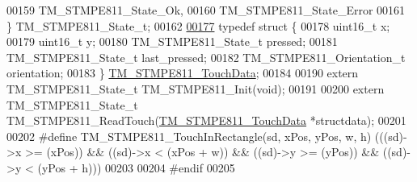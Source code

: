 \begin{DoxyCode}
00159     TM\_STMPE811\_State\_Ok,
00160     TM\_STMPE811\_State\_Error
00161 \} TM\_STMPE811\_State\_t;
00162 
\hypertarget{tm__stm32f4__stmpe811_8h_source_l00177}{}\hyperlink{struct_t_m___s_t_m_p_e811___touch_data}{00177} \textcolor{keyword}{typedef} \textcolor{keyword}{struct }\{
00178     uint16\_t x;
00179     uint16\_t y;
00180     TM\_STMPE811\_State\_t pressed;
00181     TM\_STMPE811\_State\_t last\_pressed;
00182     TM\_STMPE811\_Orientation\_t orientation;
00183 \} \hyperlink{struct_t_m___s_t_m_p_e811___touch_data}{TM\_STMPE811\_TouchData};
00184 
00190 \textcolor{keyword}{extern} TM\_STMPE811\_State\_t TM\_STMPE811\_Init(\textcolor{keywordtype}{void});
00191 
00200 \textcolor{keyword}{extern} TM\_STMPE811\_State\_t TM\_STMPE811\_ReadTouch(\hyperlink{struct_t_m___s_t_m_p_e811___touch_data}{TM\_STMPE811\_TouchData} *structdata);
00201 
00202 \textcolor{preprocessor}{#define TM\_STMPE811\_TouchInRectangle(sd, xPos, yPos, w, h)  (((sd)->x >= (xPos)) && ((sd)->x < (xPos + w))
       && ((sd)->y >= (yPos)) && ((sd)->y < (yPos + h)))}
00203 
00204 \textcolor{preprocessor}{#endif}
00205 
\end{DoxyCode}
